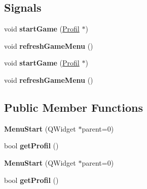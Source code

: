 \subsection*{Signals}
\begin{DoxyCompactItemize}
\item 
\hypertarget{class_menu_start_a6bb370ac28c64683a712f30b19a97bc8}{}void {\bfseries start\+Game} (\hyperlink{class_profil}{Profil} $\ast$)\label{class_menu_start_a6bb370ac28c64683a712f30b19a97bc8}

\item 
\hypertarget{class_menu_start_a277ad4799e66f6b7e314d159467bc963}{}void {\bfseries refresh\+Game\+Menu} ()\label{class_menu_start_a277ad4799e66f6b7e314d159467bc963}

\item 
\hypertarget{class_menu_start_a6bb370ac28c64683a712f30b19a97bc8}{}void {\bfseries start\+Game} (\hyperlink{class_profil}{Profil} $\ast$)\label{class_menu_start_a6bb370ac28c64683a712f30b19a97bc8}

\item 
\hypertarget{class_menu_start_a277ad4799e66f6b7e314d159467bc963}{}void {\bfseries refresh\+Game\+Menu} ()\label{class_menu_start_a277ad4799e66f6b7e314d159467bc963}

\end{DoxyCompactItemize}
\subsection*{Public Member Functions}
\begin{DoxyCompactItemize}
\item 
\hypertarget{class_menu_start_a184ff65bb2534378670fee22487b02eb}{}{\bfseries Menu\+Start} (Q\+Widget $\ast$parent=0)\label{class_menu_start_a184ff65bb2534378670fee22487b02eb}

\item 
\hypertarget{class_menu_start_aa472610f5ba9e271cb02159d2ca421cc}{}bool {\bfseries get\+Profil} ()\label{class_menu_start_aa472610f5ba9e271cb02159d2ca421cc}

\item 
\hypertarget{class_menu_start_a184ff65bb2534378670fee22487b02eb}{}{\bfseries Menu\+Start} (Q\+Widget $\ast$parent=0)\label{class_menu_start_a184ff65bb2534378670fee22487b02eb}

\item 
\hypertarget{class_menu_start_aa472610f5ba9e271cb02159d2ca421cc}{}bool {\bfseries get\+Profil} ()\label{class_menu_start_aa472610f5ba9e271cb02159d2ca421cc}

\end{DoxyCompactItemize}
